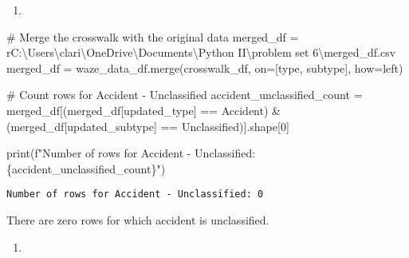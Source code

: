\documentclass[
  letterpaper,
  DIV=11,
  numbers=noendperiod]{scrartcl}
\newenvironment{Shaded}{\begin{snugshade}}{\end{snugshade}}
\newcommand{\BuiltInTok}[1]{\textcolor[rgb]{0.00,0.23,0.31}{#1}}
\newcommand{\CommentTok}[1]{\textcolor[rgb]{0.37,0.37,0.37}{#1}}
\newcommand{\DecValTok}[1]{\textcolor[rgb]{0.68,0.00,0.00}{#1}}
\newcommand{\NormalTok}[1]{\textcolor[rgb]{0.00,0.23,0.31}{#1}}
\newcommand{\OperatorTok}[1]{\textcolor[rgb]{0.37,0.37,0.37}{#1}}
\newcommand{\SpecialCharTok}[1]{\textcolor[rgb]{0.37,0.37,0.37}{#1}}
\newcommand{\SpecialStringTok}[1]{\textcolor[rgb]{0.13,0.47,0.30}{#1}}
\newcommand{\StringTok}[1]{\textcolor[rgb]{0.13,0.47,0.30}{#1}}
\newcommand{\VerbatimStringTok}[1]{\textcolor[rgb]{0.13,0.47,0.30}{#1}}
\providecommand{\tightlist}{%
  \setlength{\itemsep}{0pt}\setlength{\parskip}{0pt}}\usepackage{longtable,booktabs,array}
\begin{document}
\begin{enumerate}
\def\labelenumi{\arabic{enumi}.}
\setcounter{enumi}{2}
\tightlist
\item
\end{enumerate}

\begin{Shaded}
\begin{Highlighting}[]
\CommentTok{\# Merge the crosswalk with the original data}
\NormalTok{merged\_df }\OperatorTok{=} \VerbatimStringTok{r\textquotesingle{}C:\textbackslash{}Users\textbackslash{}clari\textbackslash{}OneDrive\textbackslash{}Documents\textbackslash{}Python II\textbackslash{}problem set 6\textbackslash{}merged\_df.csv\textquotesingle{}}
\NormalTok{merged\_df }\OperatorTok{=}\NormalTok{ waze\_data\_df.merge(crosswalk\_df, on}\OperatorTok{=}\NormalTok{[}\StringTok{\textquotesingle{}type\textquotesingle{}}\NormalTok{, }\StringTok{\textquotesingle{}subtype\textquotesingle{}}\NormalTok{], how}\OperatorTok{=}\StringTok{\textquotesingle{}left\textquotesingle{}}\NormalTok{)}

\CommentTok{\# Count rows for Accident {-} Unclassified}
\NormalTok{accident\_unclassified\_count }\OperatorTok{=}\NormalTok{ merged\_df[(merged\_df[}\StringTok{\textquotesingle{}updated\_type\textquotesingle{}}\NormalTok{] }\OperatorTok{==} \StringTok{\textquotesingle{}Accident\textquotesingle{}}\NormalTok{) }\OperatorTok{\&} 
\NormalTok{                                        (merged\_df[}\StringTok{\textquotesingle{}updated\_subtype\textquotesingle{}}\NormalTok{] }\OperatorTok{==} \StringTok{\textquotesingle{}Unclassified\textquotesingle{}}\NormalTok{)].shape[}\DecValTok{0}\NormalTok{]}

\BuiltInTok{print}\NormalTok{(}\SpecialStringTok{f"Number of rows for Accident {-} Unclassified: }\SpecialCharTok{\{}\NormalTok{accident\_unclassified\_count}\SpecialCharTok{\}}\SpecialStringTok{"}\NormalTok{)}
\end{Highlighting}
\end{Shaded}

\begin{verbatim}
Number of rows for Accident - Unclassified: 0
\end{verbatim}

There are zero rows for which accident is unclassified.

\begin{enumerate}
\def\labelenumi{\arabic{enumi}.}
\setcounter{enumi}{3}
\tightlist
\item
\end{enumerate}
\end{document}
